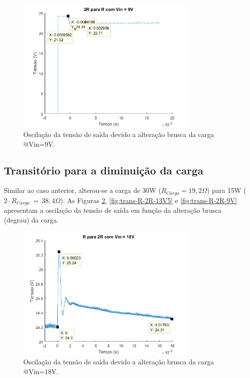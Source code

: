 \documentclass[a4paper]{article}
\begin{document}
{\begin{figure}[H]
	\centering
	\includegraphics[width=0.8\textwidth]{2R-para-R-9V.png}
	\caption{Oscilação da tensão de saída devido a alteração brusca da carga @Vin=9V.}
	\label{fig:trans-2R-R-9V}
\end{figure}


\subsection{Transitório para a diminuição da carga}

Similar ao caso anterior, alterou-se a carga de 30W ($R_{Carga} = 19,2\Omega$) para 15W ($2 \cdot R_{Carga}~=~38,4\Omega$). As Figuras \ref{fig:trans-R-2R-18V}, \ref{fig:trans-R-2R-13V5} e \ref{fig:trans-R-2R-9V} apresentam a oscilação da tensão de saída em função da alteração brusca (degrau) da carga.

\begin{figure}[H]
	\centering
	\includegraphics[width=0.8\textwidth]{R-para-2R-18V.png}
	\caption{Oscilação da tensão de saída devido a alteração brusca da carga @Vin=18V.}
	\label{fig:trans-R-2R-18V}
\end{figure}

}
\end{document}
